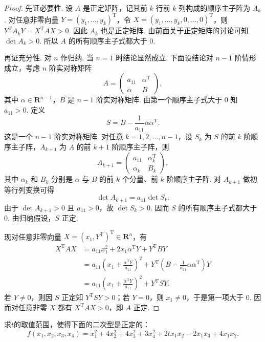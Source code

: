 \begin{proof}
    先证必要性. 设 $A$ 是正定矩阵，记其前 $k$ 行前 $k$ 列构成的顺序主子阵为 $A_k$. 对任意非零向量 $Y=(y_1,\ldots,y_k)^\mathrm{T}$，令 $X=(y_1,\ldots,y_k,0,\ldots,0)^\mathrm{T}$，则 $Y^\mathrm{T}A_kY=X^\mathrm{T}AX>0$. 因此 $A_k$ 也是正定矩阵. 由前面关于正定矩阵的讨论可知 $\det A_k>0$. 所以 $A$ 的所有顺序主子式都大于 $0$.

    再证充分性. 对 $n$ 作归纳. 当 $n = 1$ 时结论显然成立. 下面设结论对 $n - 1$ 阶情形成立，考虑 $n$ 阶实对称矩阵
    \[
        A=\begin{pmatrix}
            a_{11} & \alpha^\mathrm{T} \\
            \alpha & B
        \end{pmatrix},
    \]
    其中 $\alpha\in\mathbf{R}^{n-1}$，$B$ 是 $n - 1$ 阶实对称矩阵. 由第一个顺序主子式大于 $0$ 知 $a_{11}>0$. 定义
    \[
        S=B-\frac{1}{a_{11}}\alpha\alpha^\mathrm{T}.
    \]
    这是一个 $n - 1$ 阶实对称矩阵. 对任意 $k=1,2,\ldots,n-1$，设 $S_k$ 为 $S$ 的前 $k$ 阶顺序主子阵，$A_{k+1}$ 为 $A$ 的前 $k+1$ 阶顺序主子阵，则
    \[
        A_{k+1}=
        \begin{pmatrix}
            a_{11} & \alpha_k^\mathrm{T} \\
            \alpha_k & B_k
        \end{pmatrix},
    \]
    其中 $\alpha_k$ 和 $B_k$ 分别是 $\alpha$ 与 $B$ 的前 $k$ 个分量、前 $k$ 阶顺序主子阵. 对 $A_{k+1}$ 做初等行列变换可得
    \[
        \det A_{k+1}=a_{11}\det S_k.
    \]
    由于 $\det A_{k+1}>0$ 且 $a_{11}>0$，故 $\det S_k>0$. 因而 $S$ 的所有顺序主子式都大于 $0$. 由归纳假设，$S$ 正定.

    现对任意非零向量 $X=(x_1,Y^\mathrm{T})^\mathrm{T}\in\mathbf{R}^n$，有
    \begin{align*}
        X^\mathrm{T}AX
         & = a_{11}x_1^2+2x_1\alpha^\mathrm{T}Y+Y^\mathrm{T}BY \\
         & = a_{11}\left(x_1+\frac{\alpha^\mathrm{T}Y}{a_{11}}\right)^2+Y^\mathrm{T}\left(B-\frac{1}{a_{11}}\alpha\alpha^\mathrm{T}\right)Y \\
         & = a_{11}\left(x_1+\frac{\alpha^\mathrm{T}Y}{a_{11}}\right)^2+Y^\mathrm{T}SY.
    \end{align*}
    若 $Y\neq 0$，则因 $S$ 正定知 $Y^\mathrm{T}SY>0$；若 $Y=0$，则 $x_1\neq 0$，于是第一项大于 $0$. 因而对任意非零 $X$ 都有 $X^\mathrm{T}AX>0$，即 $A$ 正定.
\end{proof}

\begin{example}{}{}
    求$t$的取值范围，使得下面的二次型是正定的：
    \[f(x_1,x_2,x_3,x_4) = x_1^2+4x_2^2+4x_3^2+3x_4^2+2tx_1x_2-2x_1x_3+4x_1x_2.\]
\end{example}

